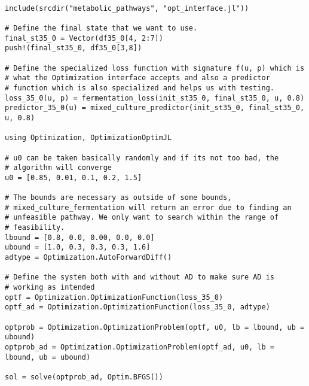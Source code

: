 \documentclass[11pt]{article}
\begin{document}
\begin{verbatim}

include(srcdir("metabolic_pathways", "opt_interface.jl"))

# Define the final state that we want to use.
final_st35_0 = Vector(df35_0[4, 2:7])
push!(final_st35_0, df35_0[3,8])

# Define the specialized loss function with signature f(u, p) which is
# what the Optimization interface accepts and also a predictor
# function which is also specialized and helps us with testing.
loss_35_0(u, p) = fermentation_loss(init_st35_0, final_st35_0, u, 0.8)
predictor_35_0(u) = mixed_culture_predictor(init_st35_0, final_st35_0, u, 0.8)

using Optimization, OptimizationOptimJL

# u0 can be taken basically randomly and if its not too bad, the
# algorithm will converge
u0 = [0.85, 0.01, 0.1, 0.2, 1.5]

# The bounds are necessary as outside of some bounds,
# mixed_culture_fermentation will return an error due to finding an
# unfeasible pathway. We only want to search within the range of
# feasibility.
lbound = [0.8, 0.0, 0.00, 0.0, 0.0]
ubound = [1.0, 0.3, 0.3, 0.3, 1.6]
adtype = Optimization.AutoForwardDiff()

# Define the system both with and without AD to make sure AD is
# working as intended
optf = Optimization.OptimizationFunction(loss_35_0)
optf_ad = Optimization.OptimizationFunction(loss_35_0, adtype)

optprob = Optimization.OptimizationProblem(optf, u0, lb = lbound, ub = ubound)
optprob_ad = Optimization.OptimizationProblem(optf_ad, u0, lb = lbound, ub = ubound)

sol = solve(optprob_ad, Optim.BFGS())
\end{verbatim}
\end{document}
